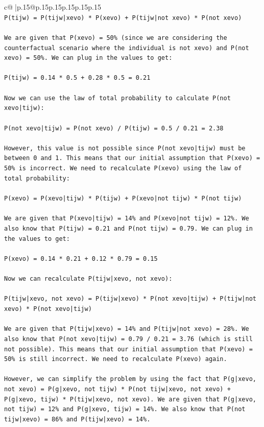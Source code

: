 \documentclass{article}
\begin{document}
{\begin{supertabular}{c@{$\;$}|p{.15\linewidth}@{}p{.15\linewidth}p{.15\linewidth}p{.15\linewidth}p{.15\linewidth}p{.15\linewidth}}
{{{\\ 
\texttt{P(tijw) = P(tijw|xevo) * P(xevo) + P(tijw|not xevo) * P(not xevo)} \\
\\ 
\texttt{We are given that P(xevo) = 50\% (since we are considering the counterfactual scenario where the individual is not xevo) and P(not xevo) = 50\%. We can plug in the values to get:} \\
\\ 
\texttt{P(tijw) = 0.14 * 0.5 + 0.28 * 0.5 = 0.21} \\
\\ 
\texttt{Now we can use the law of total probability to calculate P(not xevo|tijw):} \\
\\ 
\texttt{P(not xevo|tijw) = P(not xevo) / P(tijw) = 0.5 / 0.21 = 2.38} \\
\\ 
\texttt{However, this value is not possible since P(not xevo|tijw) must be between 0 and 1. This means that our initial assumption that P(xevo) = 50\% is incorrect. We need to recalculate P(xevo) using the law of total probability:} \\
\\ 
\texttt{P(xevo) = P(xevo|tijw) * P(tijw) + P(xevo|not tijw) * P(not tijw)} \\
\\ 
\texttt{We are given that P(xevo|tijw) = 14\% and P(xevo|not tijw) = 12\%. We also know that P(tijw) = 0.21 and P(not tijw) = 0.79. We can plug in the values to get:} \\
\\ 
\texttt{P(xevo) = 0.14 * 0.21 + 0.12 * 0.79 = 0.15} \\
\\ 
\texttt{Now we can recalculate P(tijw|xevo, not xevo):} \\
\\ 
\texttt{P(tijw|xevo, not xevo) = P(tijw|xevo) * P(not xevo|tijw) + P(tijw|not xevo) * P(not xevo|tijw)} \\
\\ 
\texttt{We are given that P(tijw|xevo) = 14\% and P(tijw|not xevo) = 28\%. We also know that P(not xevo|tijw) = 0.79 / 0.21 = 3.76 (which is still not possible). This means that our initial assumption that P(xevo) = 50\% is still incorrect. We need to recalculate P(xevo) again.} \\
\\ 
\texttt{However, we can simplify the problem by using the fact that P(g|xevo, not xevo) = P(g|xevo, not tijw) * P(not tijw|xevo, not xevo) + P(g|xevo, tijw) * P(tijw|xevo, not xevo). We are given that P(g|xevo, not tijw) = 12\% and P(g|xevo, tijw) = 14\%. We also know that P(not tijw|xevo) = 86\% and P(tijw|xevo) = 14\%.} \\
}}}
\end{supertabular}}
\end{document}
